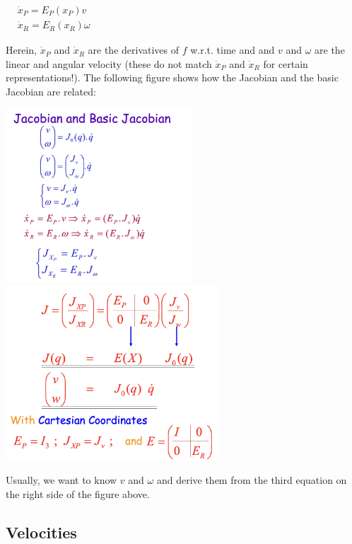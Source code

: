 \begin{center}
	$\begin{aligned}
&\dot{x}_{P}=E_{P}\left(x_{P}\right) v \\
&\dot{x}_{R}=E_{R}\left(x_{R}\right) \omega
\end{aligned}$
\end{center}

Herein, $\dot{x}_{P}$ and $\dot{x}_{R}$ are the derivatives of $f$ w.r.t. time and and $v$ and $\omega$ are the linear and angular velocity (these do not match $\dot{x}_{P}$ and $\dot{x}_{R}$ for certain representations!). The following figure shows how the Jacobian and the basic Jacobian are related:

\begin{center}
	\includegraphics[width=7cm]{sections/imgs/4_jacobian_and_basic_jacobian.png}
	\includegraphics[width=8cm]{sections/imgs/4_x_basic_jacobian_relation.png}
\end{center}

Usually, we want to know $v$ and $\omega$ and derive them from the third equation on the right side of the figure above.

 
\subsection{Velocities}

